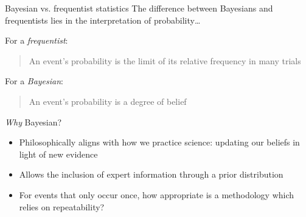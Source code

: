 \documentclass[aspectratio=169]{beamer}
\begin{document}
\begin{frame}{Bayesian vs. frequentist statistics}
  The difference between Bayesians and frequentists lies in the interpretation
  of probability\ldots

  For a \emph{frequentist}:\\\vspace{0.25cm}
  \begin{quote}
    {\normalfont An event's probability is the limit of its \alert{relative
        frequency in many trials}}
  \end{quote}

  For a \emph{Bayesian}:\\\vspace{0.25cm}
  \begin{quote}
    {\normalfont An event's probability is a \alert{degree of belief}}
  \end{quote}
\end{frame}

\begin{frame}{\emph{Why} Bayesian?}
  \begin{itemize}
    \item Philosophically aligns with how we practice science: \alert{updating}
          our \alert{beliefs} in light of \alert{new evidence}
    \item Allows the inclusion of expert information through a \alert{prior
            distribution}
    \item For events that only occur once, how appropriate is a methodology
          which relies on repeatability?
  \end{itemize}
\end{frame}
\end{document}
